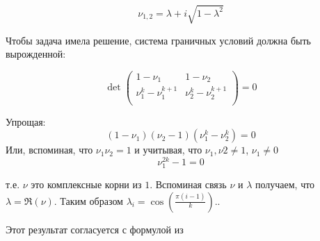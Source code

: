 \begin{equation}
	\nu_{1,2} = \lambda + i \sqrt{1 - \lambda^2}
\end{equation}

Чтобы задача имела решение, система граничных условий должна быть вырожденной:

\begin{equation}
	\det \begin{pmatrix} 
	1 - \nu_1 & 1 - \nu_2 \\
	\nu_1^k - \nu_1^{k+1} &  \nu_2^k - \nu_2^{k+1} \\
	\end{pmatrix} = 0
\end{equation}

Упрощая:
\begin{equation}
(1-\nu_1)(\nu_2-1)(\nu_1^k-\nu_2^k)=0
\end{equation}
Или, вспоминая, что $\nu_1 \nu_2 = 1$ и учитывая, что $\nu_1, \nu2 \neq 1$, $\nu_1 \neq 0$
\begin{equation}
\nu_1^{2k}-1 = 0
\end{equation}


т.е. $\nu$ это комплексные корни из $1$. Вспоминая связь $\nu$ и $\lambda$ получаем, что $\lambda = \Re(\nu)$. Таким образом $\lambda_i = \cos(\frac{\pi (i-1)}{k}).$.

Этот результат согласуется с формулой из \cite{farhi1993correlation}
